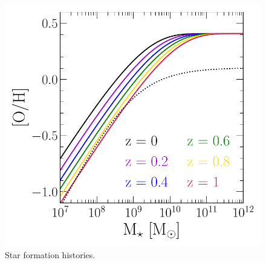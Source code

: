 \documentclass[ms.tex]{subfiles}
\begin{document}
\begin{figure}
\includegraphics[scale = 0.42]{mzr.pdf}
\caption{Star formation histories.}
\label{fig:sfhs}
\end{figure}

\end{document}
